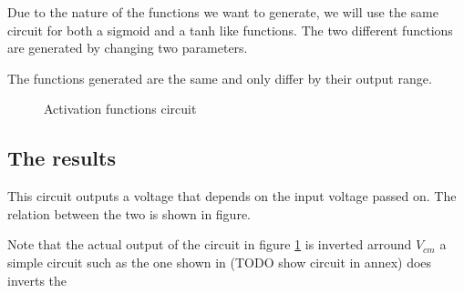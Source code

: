 Due to the nature of the functions we want to generate, we will use the same circuit for both a sigmoid and a \ac{tanh} like functions. The two different functions are generated by changing two parameters.

The functions generated are the same and only differ by their output range.

\begin{figure}[H]
  \centering
  
  \caption{Activation functions circuit}
  \label{fig:afCircuit}
\end{figure}

\subsection{The results}

This circuit outputs a voltage that depends on the input voltage passed on. The relation between the two is shown in figure. %

Note that the actual output of the circuit in figure \ref{fig:afCircuit} is inverted arround $V_{cm}$ a simple circuit such as the one shown in  (TODO show circuit in annex) does inverts the

